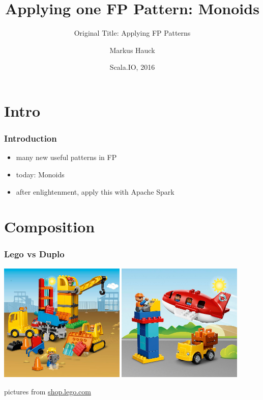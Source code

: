 \documentclass{beamer}
\title{Applying \textbf{one} FP Pattern: Monoids}
\subtitle{Original Title: Applying FP Patterns}
\author{Markus Hauck}
\date{Scala.IO, 2016}
\begin{document}
\frame{\titlepage}

\section{Intro}
\label{sec:intro}

\begin{frame}
  \frametitle{Introduction}
  \begin{itemize}
  \item many new useful patterns in FP
  \item today: Monoids
  \item after enlightenment, apply this with Apache Spark
  \end{itemize}
\end{frame}

\section{Composition}

\begin{frame}
  \frametitle{Lego vs Duplo}
  \begin{center}
    \includegraphics[width=0.45\textwidth]{../images/duplo-construction.jpg}
    \hspace{1mm}
    \includegraphics[width=0.45\textwidth]{../images/duplo-airport.jpg}
  \end{center}
  \vfill
  \begin{center}
    {\tiny pictures from \url{shop.lego.com}}
  \end{center}
\end{frame}
\end{document}
